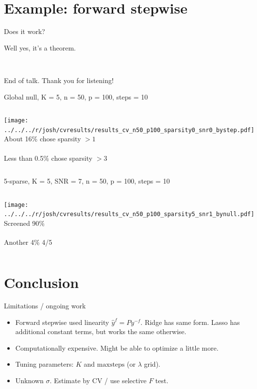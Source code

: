 \documentclass{beamer}
\begin{document}
\section{Example: forward stepwise}
\label{sec:fs}

\begin{frame}{Does it work?}
  
  Well yes, it's a theorem. 

  \  

  End of talk. Thank you for listening!


\end{frame}

\begin{frame}{Global null, K = 5, n = 50, p = 100, steps = 10}
  
  \begin{columns}[c]
    \texttt{[image: ../../../r/josh/cvresults/results\_cv\_n50\_p100\_sparsity0\_snr0\_bystep.pdf]}
    About 16\% chose sparsity $> 1$ \\ \  \\ Less than 0.5\% chose sparsity $> 3$
  \end{columns}

\end{frame}

\begin{frame}{5-sparse, K = 5, SNR = 7, n = 50, p = 100, steps = 10}
  
  \begin{columns}[c]
    \texttt{[image: ../../../r/josh/cvresults/results\_cv\_n50\_p100\_sparsity5\_snr1\_bynull.pdf]}
    Screened 90\% \\ \  \\ Another 4\% 4/5
  \end{columns}
    
\end{frame}

\section{Conclusion}
\label{sec:future}

\begin{frame}{Limitations / ongoing work}

  \begin{itemize}

  \item Forward stepwise used linearity $\hat y^f = P y^{-f}$. Ridge
    has same form. Lasso has additional constant terms, but 
    works the same otherwise.

  \item Computationally expensive. Might be able to optimize a little more. 

  \item Tuning parameters: $K$ and $\text{maxsteps}$ (or $\lambda$
    grid).

  \item Unknown $\sigma$. Estimate by CV / use selective $F$ test. 

  \end{itemize}
  
\end{frame}
\end{document}
